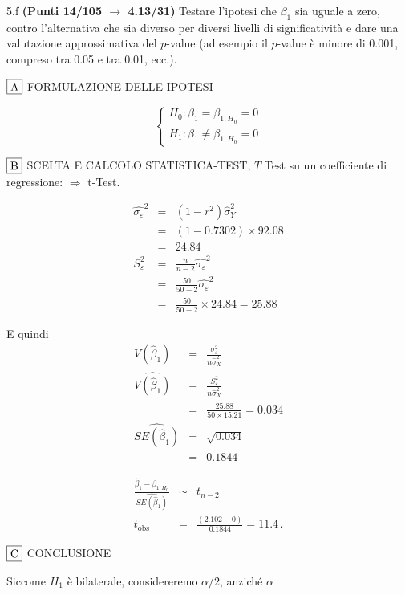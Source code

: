\documentclass[
  11pt,
]{book}
\theoremstyle{mytheoremstyle}
\theoremstyle{mydefstyle}
\newenvironment{sol}
  {
  \begin{tcolorbox}[enhanced,breakable,arc=0.1mm,boxrule=1pt,colback=white,colframe=iblue,
  title=\bf \fontfamily{lmss}\selectfont \hspace{.5 cm} Soluzione,drop fuzzy shadow]

}{
\end{tcolorbox}
  }
\begin{document}
5.f \textbf{(Punti 14/105 \(\rightarrow\) 4.13/31)} Testare l'ipotesi che \(\beta_1\) sia uguale a zero, contro l'alternativa che sia diverso per diversi livelli di significatività e dare una valutazione approssimativa del \(p\)-value (ad esempio il \(p\)-value è minore di 0.001, compreso tra 0.05 e tra 0.01, ecc.).

\begin{sol}
\(\fbox{A}\) FORMULAZIONE DELLE IPOTESI

\[\begin{cases}
   H_0: \beta_1 = \beta_{1;H_0}=0 \\
   H_1: \beta_1 \neq \beta_{1;H_0}=0 
   \end{cases}\]

\(\fbox{B}\) SCELTA E CALCOLO STATISTICA-TEST, \(T\)
Test su un coefficiente di regressione: \(\Rightarrow\) t-Test.

\begin{eqnarray*}
\hat{\sigma_\varepsilon}^2&=&(1-r^2)\hat\sigma_Y^2\\
&=& (1- 0.7302 )\times 92.08 \\
   &=&  24.84 \\
   S_\varepsilon^2 &=& \frac{n} {n-2} \hat{\sigma_\varepsilon}^2\\
   &=&  \frac{ 50 } { 50 -2} \hat{\sigma_\varepsilon}^2 \\
 &=&  \frac{ 50 } { 50 -2} \times  24.84  =  25.88  
\end{eqnarray*}

E quindi\begin{eqnarray*}
V(\hat\beta_{1}) &=& \frac{\sigma_{\varepsilon}^{2}} {n \hat{\sigma}^{2}_{X}} \\
\widehat{V(\hat\beta_{1})} &=& \frac{S_{\varepsilon}^{2}} {n \hat{\sigma}^{2}_{X}} \\
 &=& \frac{ 25.88 } { 50 \times  15.21 } =  0.034 \\
 \widehat{SE(\hat\beta_{1})}        &=&  \sqrt{ 0.034 }\\
 &=&  0.1844 
\end{eqnarray*}

\begin{eqnarray*}
 \frac{\hat\beta_{ 1 } - \beta_{ 1 ;H_0}} {\widehat{SE(\hat\beta_{ 1 })}}&\sim&t_{n-2}\\
   t_{\text{obs}}
&=& \frac{ ( 2.102 -  0 )} { 0.1844 }
 =   11.4 \, .
\end{eqnarray*}

\(\fbox{C}\) CONCLUSIONE

Siccome \(H_1\) è bilaterale, considereremo \(\alpha/2\),
anziché \(\alpha\)


\end{sol}
\end{document}
